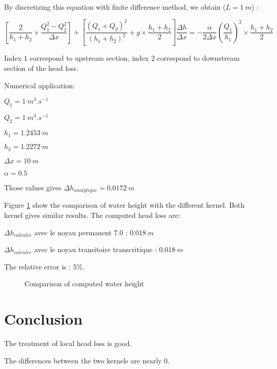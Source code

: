 By discretizing this equation with finite difference method, we obtain ($ L = 1\ m $) :

\begin{equation}
\left[\frac{2}{h_{1}+h_{2}}\times \frac{Q^{2}_{1}-Q^{2}_{2}}{\Delta x}\right] +\left[\frac {(Q_{1}+Q_{2})^{2}}{(h_{1}+h_{2})^2}+g \times \frac{h_{1}+h_{2}}{2}\right]\frac{\Delta h }{\Delta x}=-\frac{\alpha}{2\Delta x}\left(\frac{Q_{1}}{h_{1}}\right)^2\times \frac{h_{1}+h_{2}}{2}
\end{equation}

Index $1$ correspond to upstream section, index $2$ correspond to downstream section of the head loss.

Numerical application:
\begin{description}
\item $ Q_{1} = 1\ m^3.s^{-1} $ 
\item $ Q_{2} = 1\ m^3.s^{-1} $
\item $ h_{1} = 1.2453 \ m $
\item $ h_{2} = 1.2272 \ m $
\item $ \Delta x = 10 \ m $
\item $ \alpha = 0.5 $
\end{description}

Those values gives $ \Delta h_{analytique} = 0.0172\ m $

Figure \ref{mascaret:singular_headloss:long} show the comparison of water height with the different kernel.
Both kernel gives similar results.
The computed head loss are:
\begin{description}
\item $ \Delta h_{calculee} $ avec le noyau permanent 7.0 : $ 0.018 \ m $
\item $ \Delta h_{calculee} $ avec le noyau transitoire transcritique : $ 0.018 \ m $
\end{description}
The relative error is : $ 5 \% $.

\begin{figure}[H]
\centering
{}
\caption{Comparison of computed water height}
\label{mascaret:singular_headloss:long}
\end{figure}


\section{Conclusion}
The treatment of local head loss is good.

The differences between the two kernels are nearly 0.
